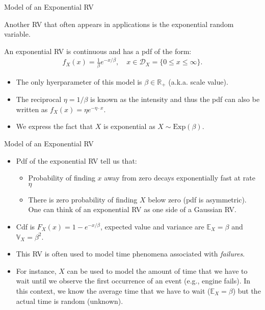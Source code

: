\documentclass[9pt]{beamer}
\begin{document}
%
\begin{frame}{Model of an Exponential RV}

Another RV that often appears in applications is the exponential random variable.  

\begin{block}{}
An exponential RV is continuous and has a pdf of the form:
\begin{align*}
f_X(x)=\frac{1}{\beta}e^{-x/\beta},\quad x\in \mathcal{D}_X=\{0\leq x\leq \infty\}.
\end{align*}
\end{block}
\begin{itemize}
\item The only hyerparameter of this model is $\beta \in \mathbb{R}_+$ (a.k.a. scale value). 
\item The reciprocal $\eta=1/\beta$ is known as the intensity and thus the pdf can also be written as $f_X(x)=\eta e^{-\eta\cdot x}$. 
\item We express the fact that $X$ is exponential as $X\sim \textrm{Exp}(\beta)$.
\end{itemize}

\end{frame}

%
\begin{frame}{Model of an Exponential RV}

\begin{itemize}
\item Pdf of the exponential RV tell us that:
\begin{itemize} 
\item Probability of finding $x$ away from zero decays exponentially fast at rate $\eta$
\item There is zero probability of finding $X$ below zero (pdf is asymmetric). One can think of an exponential RV as one side of a Gaussian RV. 
\end{itemize}
\item Cdf is $F_X(x)=1-e^{-x/\beta}$, expected value and variance are $\mathbb{E}_X=\beta$ and $\mathbb{V}_X=\beta^2$.
\item This RV is often used to model time phenomena associated with {\em failures}. 
\item For instance, $X$ can be used to model the amount of time that we have to wait until we observe the first occurrence of an event (e.g., engine fails). In this context, we know the average time that we have to wait ($\mathbb{E}_X=\beta$) but the actual time is random (unknown). 
\end{itemize}

\end{frame}
\end{document}
